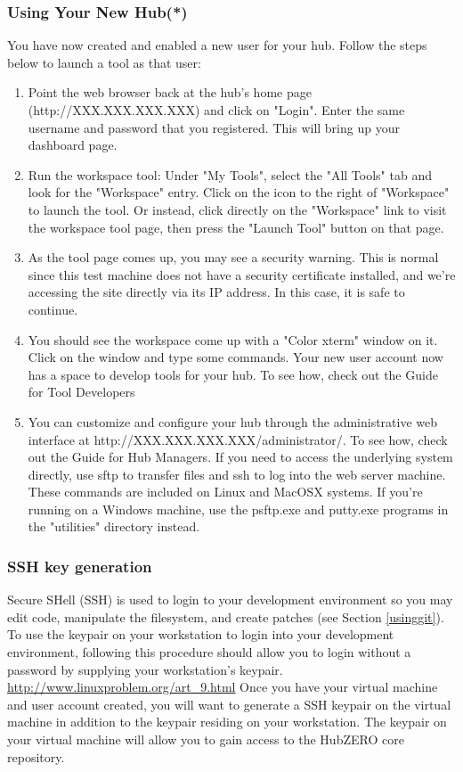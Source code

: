 \documentclass[10pt,letterpaper,titlepage]{article}
\begin{document}
\subsubsection{Using Your New Hub(*)}
You have now created and enabled a new user for your hub. Follow the steps below to launch a tool as that user:
\begin{enumerate}
\item Point the web browser back at the hub's home page (http://XXX.XXX.XXX.XXX) and click on "Login". Enter the same username and password that you registered. This will bring up your dashboard page.
\item Run the workspace tool: Under "My Tools", select the "All Tools" tab and look for the "Workspace" entry. Click on the icon to the right of "Workspace" to launch the tool. Or instead, click directly on the "Workspace" link to visit the workspace tool page, then press the "Launch Tool" button on that page.
\item As the tool page comes up, you may see a security warning. This is normal since this test machine does not have a security certificate installed, and we're accessing the site directly via its IP address. In this case, it is safe to continue.
\item You should see the workspace come up with a "Color xterm" window on it. Click on the window and type some commands. Your new user account now has a space to develop tools for your hub. To see how, check out the Guide for Tool Developers
\item You can customize and configure your hub through the administrative web interface at http://XXX.XXX.XXX.XXX/administrator/. To see how, check out the Guide for Hub Managers. If you need to access the underlying system directly, use sftp to transfer files and ssh to log into the web server machine. These commands are included on Linux and MacOSX systems. If you're running on a Windows machine, use the psftp.exe and putty.exe programs in the "utilities" directory instead.
\end{enumerate}

\subsubsection{SSH key generation}
Secure SHell (SSH) is used to login to your development environment so you may edit code, manipulate the filesystem, and create patches (see Section \ref{usinggit}).
To use the keypair on your workstation to login into your development environment, following this procedure should allow you to login without a password by supplying your workstation's keypair.
\url{http://www.linuxproblem.org/art_9.html} Once you have your virtual machine and user account created, you will want to generate a SSH keypair on the virtual machine in addition to the keypair residing on your workstation.  The keypair on your virtual machine will allow you to gain access to the HubZERO core repository. 
\end{document}
